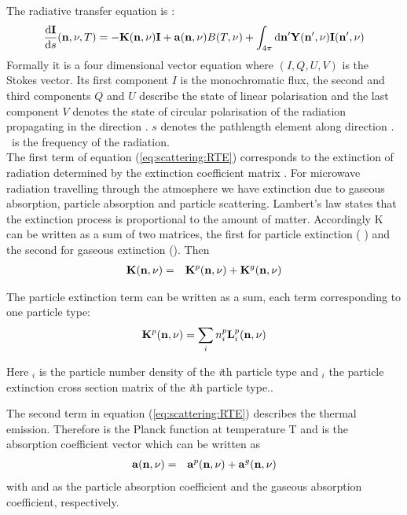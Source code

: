 \label{sec:scattering:general_rte}
 

The radiative transfer equation is \citep{mishchenko00:_light_scatt_nonsp_partic}: 
\begin{eqnarray}
     \frac{\mathrm{d} {\bf I}}{\mathrm{d} s}({\bf n}, \nu, T) =
     -{\bf K}({\bf n}, \nu){\bf I}+{\bf a}({\bf n}, \nu) B(T, \nu)
     +\int_{4\pi} \mathrm{d} {\bf n}^\prime {\bf Y}({\bf n}^\prime, \nu) {\bf I}({\bf n}^\prime, \nu) 
\label{eq:scattering:RTE} 
\end{eqnarray} 
Formally it is a four dimensional vector equation where \StoVec
$(I,Q,U,V)$ is the Stokes vector.
Its first component $I$ is the monochromatic flux, the
second and third components $Q$ and $U$ describe the state of linear
polarisation and the last component $V$ denotes the state of circular
polarisation of the radiation propagating in the direction \PDir.
\DiffD $s$ denotes the pathlength element along direction \PDir. \Frq\ 
is the frequency of the radiation.
\\

The first term of equation (\ref{eq:scattering:RTE}) corresponds to the extinction of
radiation determined by the extinction coefficient matrix \ExtMat
. For microwave radiation travelling through the atmosphere we
have extinction due to gaseous
absorption, particle absorption and  particle scattering. Lambert's law
states that the extinction process is
proportional to the amount of matter. Accordingly K can be written as
a sum of two matrices, the first for particle extinction ( \aExtMat{p})
and the second for gaseous extinction (\aExtMat{g}). Then
\begin{eqnarray}
  {\bf K}({\bf n}, \nu) &=&
  {\bf K}^{p}({\bf n}, \nu)+{\bf K}^{g}({\bf n}, \nu)
\end{eqnarray}

The particle extinction term can be written as a sum, each term
corresponding to one particle type:
\begin{eqnarray}
  {\bf K}^{p}({\bf n}, \nu) = \sum_i n^p_i {\bf L}^{p}_i ({\bf n}, \nu)
\end{eqnarray}

Here \PDen$_i$ is the particle number density of the
{\sl i}th particle type and  $_i$\DirFre{}  the particle
extinction cross section matrix of the
{\sl i}th particle type..

The second term in equation (\ref{eq:scattering:RTE})  describes the thermal
emission. Therefore \Planck{}  is the Planck
function at temperature T and \AbsVec{}  is the absorption
coefficient vector which can be written as
 \begin{eqnarray}
  {\bf a} ({\bf n}, \nu)  &=& {\bf a}^{p} ({\bf n}, \nu) + {\bf a}^{g} ({\bf n}, \nu) 
  \end{eqnarray}
with  and  as the particle
absorption 
coefficient
and the gaseous absorption coefficient, respectively. 

